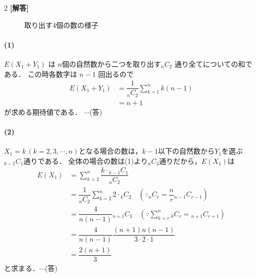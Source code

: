 \documentclass[../../main.tex]{subfiles}
\begin{document}
\setcounter{equation}{0}
\begin{oframed}
  
\end{oframed}
\setlength{\columnseprule}{0.4pt}
\begin{multicols}{2}
  {\bf [解答]}

  \begin{figure}[H]
    \centering
    \caption{取り出す$4$個の数の様子}
    \label{1991-5:fig:1}
  \end{figure}

  \paragraph{(1)}
  $E(X_1+Y_1)$ は $n$個の自然数から二つを取り出す${}_n C_2$ 通り全てについての和である．
  この時各数字は $n-1$ 回出るので
  \begin{align}
    E(X_1+Y_1)
    & = \dfrac{1}{{}_n C_2} \sum_{k=1}^n k(n-1) \\
    & = n+1
  \end{align}
  が求める期待値である．  $\cdots$(答)

  \paragraph{(2)}
  $X_1=k\, (k=2,3,\cdots, n)$となる場合の数は，$k-1$以下の自然数から$Y_1$を選ぶ${}_{k-1}C_{1}$通りである．
  全体の場合の数は(1)より${}_n C_2$通りだから，$E(X_1)$は
  \begin{align}
    E(X_1) & = \sum_{k=2}^{n} \dfrac{k \cdot {}_{k-1} C_1}{{}_n C_2}                                                      \\
    & = \dfrac{1}{{}_n C_2} \sum_{k=2}^n 2 \cdot {}_k C_2 \quad (\because {}_n C_r = \dfrac{n}{r} {}_{n-1} C_{r-1}) \\
    & = \dfrac{4}{n(n-1)} {}_{n+1} C_3 \quad (\because \sum_{k=r}^{n} {}_k C_r = {}_{n+1} C_{r+1})                \\
    & = \dfrac{4}{n(n-1)} \dfrac{(n+1)n(n-1)}{3 \cdot 2 \cdot 1}                                                    \\
    & = \dfrac{2(n+1)}{3}
  \end{align}
  と求まる．$\cdots$(答)


\end{multicols}
\end{document}
